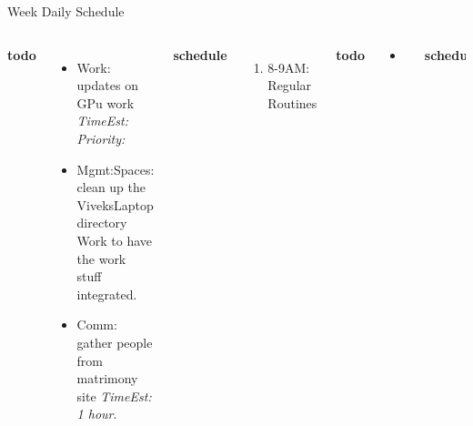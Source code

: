 \documentclass[serif, mathserif, final]{beamer}
\newcommand{\te}[1]{\textit{TimeEst:} \textit{#1}}
\newcommand{\prio}[1]{\textit{Priority:} \textit{#1}}
\newcommand{\dl}[1]{#1}
\begin{document}
\begin{frame}
\begin{columns}
\begin{column}{0.50\linewidth}
\begin{block}{Week Daily Schedule}
\begin{columns}
          \textbf{\small todo}\\ 
          \begin{itemize}
            \tiny \item \tiny Work: updates on GPu work \dl{}
            \te{} \prio{}
            \tiny \item \tiny Mgmt:Spaces: clean up the ViveksLaptop
            directory Work to have the work stuff integrated. 
            \tiny \item \tiny Comm: gather people from matrimony site \te{1 hour}. 
          \end{itemize}
          \textbf{\small schedule}\\
          \begin{enumerate}
            \tiny \item \tiny 8-9AM: Regular Routines 
          \end{enumerate}
          
          \textbf{\small todo}\\
          \begin{itemize} 
          \tiny \item \tiny
          \end{itemize}
          \textbf{\small schedule}\\ 
          \begin{enumerate}
            \tiny \item \tiny 7-7:30PM = food + organize.  
            \tiny \item \tiny 7:30PM -8PM = 
            \tiny \item \tiny 8PM -9PM = 
            \tiny \item \tiny 9:45PM - 10:30PM = go out 
            \tiny \item \tiny 2AM -3AM =  message Samir + add people
          \end{enumerate}
          
          \textbf{\small todo}\\
          \begin{itemize} 
          \item \tiny             
          \end{itemize}
          \textbf{\small schedule}\\
          \begin{enumerate} 
            \tiny \item \tiny 
          \end{enumerate} 
        \end{columns}
      \end{block}
    \end{column}%
    

\end{columns}
\end{frame}
\end{document}

